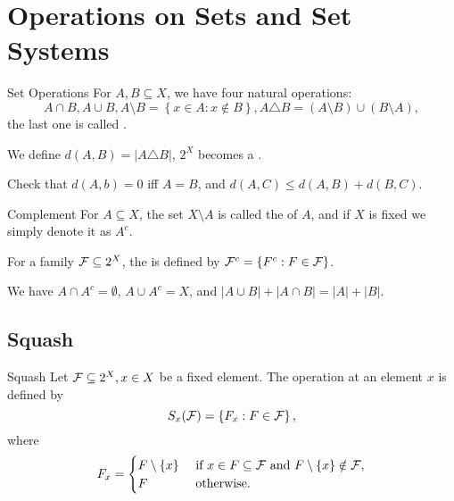 \section{Operations on Sets and Set Systems}

\begin{definition}[def:]{Set Operations}
    For $A,B\subseteq X$, we have four natural operations:
    \[A\cap B, A\cup B, A\setminus B=\left\{x\in A:x\notin B\right\}, A\triangle B=(A\setminus B)\cup (B\setminus A),\]
    the last one is called .

    We define  $d(A,B)=\left|A\triangle B\right|$, $2^X$ becomes a .
\end{definition}

\begin{remark}
    Check that $d(A,b)=0$ iff $A=B$, and $d(A,C)\leq d(A,B)+d(B,C)$.
\end{remark}

\begin{definition}[def:]{Complement}
    For $A\subseteq X$, the set $X\setminus A$ is called the  of $A$, and if $X$ is fixed we simply denote it as $A^c$. 

    For a family $\mathcal{F}\subseteq 2^X$, the  is defined by $\mathcal{F}^c=\left\{F^c:F\in \mathcal{F}\right\}$.
\end{definition}

\begin{remark}
    We have $A\cap A^c=\emptyset $, $A\cup A^c=X$, and $\left|A\cup B\right|+\left|A\cap B\right|=\left|A\right|+\left|B\right|$.
\end{remark}

\subsection{Squash}

\begin{definition}[def:]{Squash}
    Let $\mathcal{F}\subseteq 2^X, x\in X$ be a fixed element. The operation  at an element $x$ is defined by
    \[S_x(\mathcal{F})=\left\{F_x:F\in \mathcal{F}\right\},\]
    where
    \[F_x = 
        \begin{cases}
            F\setminus \left\{x\right\}&\textnormal{ if } x\in F\subseteq \mathcal{F}\textnormal{ and }F\setminus \left\{x\right\}\notin \mathcal{F},\\
            F&\textnormal{ otherwise.}
        \end{cases}
    \]
\end{definition}

